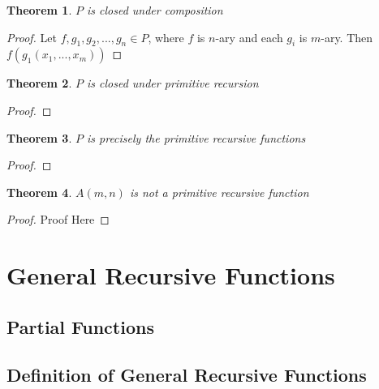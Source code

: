 \documentclass[12pt, letterpaper]{article}
\newtheorem{theorem}{Theorem}
\begin{document}
    \begin{theorem}
      $P$ is closed under composition
    \end{theorem}
    \begin{proof}
      Let $f, g_1, g_2, ..., g_n \in P$, where $f$ is $n$-ary and each $g_i$ is $m$-ary.
      Then $f(g_1(x_1, ..., x_m))$
      
    \end{proof}

    \begin{theorem}
      $P$ is closed under primitive recursion
    \end{theorem}
    \begin{proof}
      
    \end{proof}

    \begin{theorem}
      $P$ is precisely the primitive recursive functions
    \end{theorem}
    \begin{proof}
    \end{proof}

    \begin{theorem}
      $A(m, n)$ is not a primitive recursive function
    \end{theorem}
    \begin{proof}
      Proof Here
    \end{proof}


  \section{General Recursive Functions}
    \subsection{Partial Functions}
    \subsection{Definition of General Recursive Functions}
\end{document}
